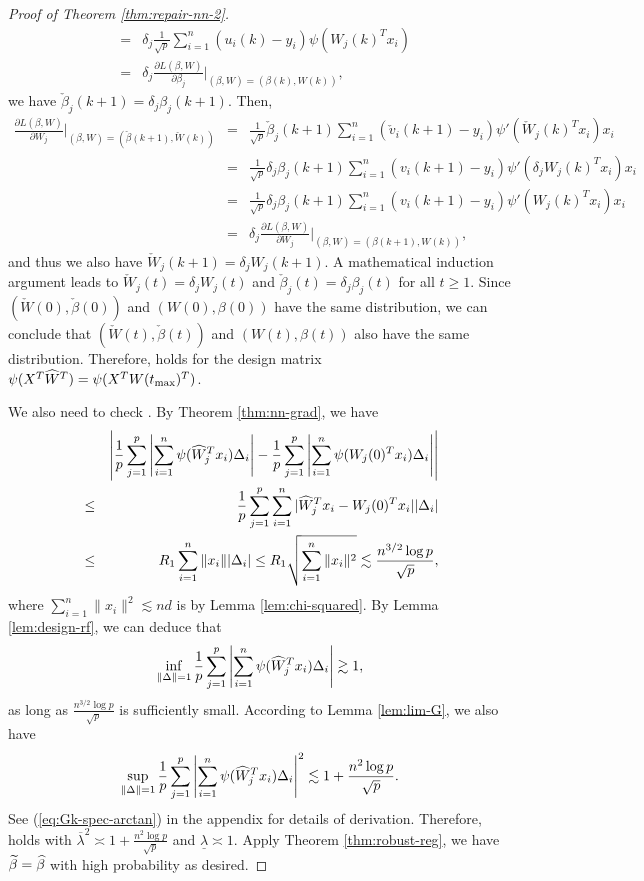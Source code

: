 \begin{proof}[Proof of Theorem \ref{thm:repair-nn-2}]
\begin{eqnarray*}
&=& \delta_j\frac{1}{\sqrt{p}}\sum_{i=1}^n({u}_i(k)-y_i)\psi({W}_j(k)^Tx_i) \\
&=& \delta_j\frac{\partial L(\beta,W)}{\partial \beta_j}|_{(\beta,W)=({\beta}(k),{W}(k))},
\end{eqnarray*}
we have $\check{\beta}_j(k+1)=\delta_j\beta_j(k+1)$.
Then,
\begin{eqnarray*}
\frac{\partial L(\beta,W)}{\partial W_j}|_{(\beta,W)=(\check{\beta}(k+1),\check{W}(k))} &=& \frac{1}{\sqrt{p}}\check{\beta}_j(k+1)\sum_{i=1}^n(\check{v}_i(k+1)-y_i)\psi'(\check{W}_j(k)^Tx_i)x_i \\
&=& \frac{1}{\sqrt{p}}\delta_j{\beta}_j(k+1)\sum_{i=1}^n({v}_i(k+1)-y_i)\psi'(\delta_j{W}_j(k)^Tx_i)x_i \\
&=& \frac{1}{\sqrt{p}}\delta_j{\beta}_j(k+1)\sum_{i=1}^n({v}_i(k+1)-y_i)\psi'({W}_j(k)^Tx_i)x_i \\
&=& \delta_j\frac{\partial L(\beta,W)}{\partial W_j}|_{(\beta,W)=({\beta}(k+1),{W}(k))},
\end{eqnarray*}
and thus we also have $\check{W}_j(k+1)=\delta_jW_j(k+1)$. A mathematical induction argument leads to $\check{W}_j(t)=\delta_jW_j(t)$ and $\check{\beta}_j(t)=\delta_j\beta_j(t)$ for all $t\geq 1$. Since $(\check{W}(0),\check{\beta}(0))$ and $(W(0),\beta(0))$ have the same distribution, we can conclude that $(\check{W}(t),\check{\beta}(t))$ and $(W(t),\beta(t))$ also have the same distribution. Therefore, \conditionAp{} holds for the design matrix $\psi(X^T\widehat{W}^T)=\psi(X^TW(t_{\max})^T)$.

We also need to check \conditionB. By Theorem \ref{thm:nn-grad}, we have
\begin{eqnarray*}
&& \left|\frac{1}{p}\sum_{j=1}^p\left|\sum_{i=1}^n\psi(\wh{W}_j^Tx_i)\Delta_i\right| - \frac{1}{p}\sum_{j=1}^p\left|\sum_{i=1}^n\psi(W_j(0)^Tx_i)\Delta_i\right|\right| \\
&\leq& \frac{1}{p}\sum_{j=1}^p\sum_{i=1}^n|\wh{W}_j^Tx_i-W_j(0)^Tx_i||\Delta_i| \\
&\leq& R_1\sum_{i=1}^n\|x_i\||\Delta_i| \leq R_1\sqrt{\sum_{i=1}^n\|x_i\|^2} \lesssim \frac{n^{3/2}\log p}{\sqrt{p}},
\end{eqnarray*}
where $\sum_{i=1}^n\|x_i\|^2\lesssim nd$ is by Lemma \ref{lem:chi-squared}. By Lemma \ref{lem:design-rf}, we can deduce that
$$\inf_{\|\Delta\|=1}\frac{1}{p}\sum_{j=1}^p\left|\sum_{i=1}^n\psi(\widehat{W}_j^Tx_i)\Delta_i\right|\gtrsim 1,$$
as long as $\frac{n^{3/2}\log p}{\sqrt{p}}$ is sufficiently small. 
According to Lemma \ref{lem:lim-G}, we also have
$$\sup_{\|\Delta\|=1}\frac{1}{p}\sum_{j=1}^p\left|\sum_{i=1}^n\psi(\widehat{W}_j^Tx_i)\Delta_i\right|^2\lesssim 1+\frac{n^2\log p}{\sqrt{p}}.$$
See (\ref{eq:Gk-spec-arctan}) in the appendix for details of derivation.
Therefore, \conditionB{} holds with $\overline{\lambda}^2\asymp 1+\frac{n^2\log p}{\sqrt{p}}$ and $\underline{\lambda}\asymp 1$. Apply Theorem \ref{thm:robust-reg}, we have $\widetilde{\beta}=\widehat{\beta}$ with high probability as desired.
\end{proof}

